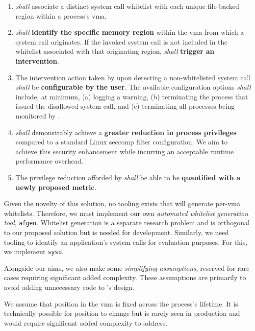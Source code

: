 \begin{enumerate}
    \item \af \textit{shall} associate a distinct system call whitelist with each unique file-backed region within a process's \ac{vma}.
    \item \af \textit{shall} \textbf{identify the specific memory region} within the \ac{vma} from which a system call originates. If the invoked system call is not included in the whitelist associated with that originating region, \af \textit{shall} \textbf{trigger an intervention}.
    \item The intervention action taken by \af upon detecting a non-whitelisted system call \textit{shall} be \textbf{configurable by the user}. The available configuration options \textit{shall} include, at minimum, (a) logging a warning, (b) terminating the process that issued the disallowed system call, and (c) terminating all processes being monitored by \af.
    \item \af \textit{shall} demonstrably achieve a \textbf{greater reduction in
        process privileges} compared to a standard Linux seccomp filter
        configuration. We aim to achieve this security enhancement while
        incurring an acceptable runtime performance overhead.
    \item The privilege reduction afforded by \af \textit{shall} be able to be
        \textbf{quantified
        with a newly proposed metric}.
\end{enumerate}

Given the novelty of this solution, no tooling exists that will generate
per-\ac{vma} whitelists. Therefore, we must implement our own \textit{automated whitelist 
generation tool}, \texttt{afgen}. Whitelist generation is a separate research problem and is
orthogonal to our proposed solution but is needed for development. 
Similarly, we need tooling to identify an application's system calls for
evaluation purposes. For this, we implement \texttt{syso}.


Alongside our aims, we also make some \textit{simplifying assumptions}, 
reserved for rare cases requiring significant added complexity. These 
assumptions are primarily to avoid adding unnecessary code to
\af's design. 
 
We assume that  position in the \ac{vma} is fixed across the process's
lifetime. It is technically possible for  position to change but is
rarely seen in production and would require significant added complexity to
address.

